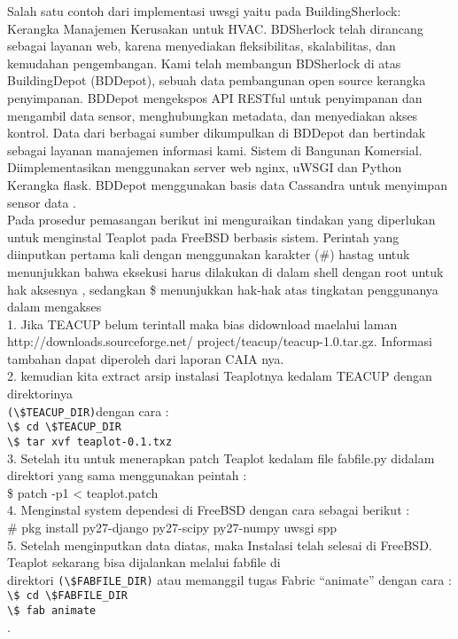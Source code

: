 \documentclass[12pt, times new roman, a4paper]{Article}
\begin{document}
	Salah satu contoh dari implementasi uwsgi yaitu pada BuildingSherlock: Kerangka Manajemen Kerusakan untuk HVAC. BDSherlock telah dirancang sebagai layanan web, karena menyediakan
fleksibilitas, skalabilitas, dan kemudahan pengembangan. Kami telah membangun BDSherlock
di atas BuildingDepot (BDDepot), sebuah data pembangunan open source
kerangka penyimpanan. BDDepot mengekspos API RESTful untuk penyimpanan dan
mengambil data sensor, menghubungkan metadata, dan menyediakan akses
kontrol. Data dari berbagai sumber dikumpulkan di BDDepot dan bertindak sebagai layanan manajemen informasi kami. Sistem di Bangunan Komersial. Diimplementasikan menggunakan server web nginx, uWSGI dan Python Kerangka flask. BDDepot menggunakan basis data Cassandra untuk menyimpan sensor data  \cite{teraoka2014buildingsherlock}.\\

	Pada prosedur pemasangan berikut ini menguraikan tindakan yang diperlukan untuk menginstal Teaplot pada  FreeBSD berbasis sistem. Perintah yang diinputkan pertama kali  dengan menggunakan karakter  (\#) hastag  untuk menunjukkan bahwa eksekusi harus dilakukan di dalam shell dengan root untuk hak aksesnya , sedangkan \$ menunjukkan hak-hak atas tingkatan penggunanya dalam mengakses\\

1.	Jika TEACUP belum terintall maka bias didownload maelalui laman http://downloads.sourceforge.net/
	project/teacup/teacup-1.0.tar.gz. Informasi tambahan dapat diperoleh dari laporan CAIA nya.\\
2.	kemudian kita extract arsip instalasi Teaplotnya kedalam  TEACUP  dengan direktorinya \\
\verb|(\$TEACUP_DIR)|dengan cara :\\
\verb|\$ cd \$TEACUP_DIR|\\
\verb|\$ tar xvf teaplot-0.1.txz|\\
3.	Setelah itu untuk menerapkan patch Teaplot kedalam file fabfile.py didalam direktori yang sama menggunakan peintah :\\
	\$ patch -p1 < teaplot.patch\\
4.	Menginstal system dependesi di FreeBSD dengan cara sebagai berikut :\\
 	\# pkg install py27-django py27-scipy py27-numpy uwsgi spp\\
5.	Setelah menginputkan data diatas, maka Instalasi telah selesai di FreeBSD. Teaplot sekarang bisa dijalankan melalui fabfile di\\
	direktori \verb|(\$FABFILE_DIR)| atau memanggil tugas Fabric “animate” dengan cara :\\
\verb|\$ cd \$FABFILE_DIR|\\
\verb|\$ fab animate|\\ \cite{true150828teaplot}.\\
\end{document}
